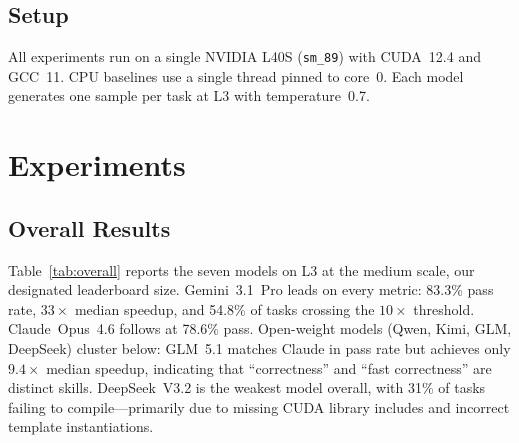 \documentclass{article}
\begin{document}
\subsection{Setup}
All experiments run on a single NVIDIA L40S (\texttt{sm\_89}) with CUDA~12.4 and GCC~11. CPU baselines use a single thread pinned to core~0. Each model generates one sample per task at L3 with temperature~0.7.

\section{Experiments}
\label{sec:results}

\subsection{Overall Results}

Table~\ref{tab:overall} reports the seven models on L3 at the medium scale, our designated leaderboard size. Gemini~3.1~Pro leads on every metric: 83.3\% pass rate, $33\times$ median speedup, and 54.8\% of tasks crossing the $10\times$ threshold. Claude~Opus~4.6 follows at 78.6\% pass. Open-weight models (Qwen, Kimi, GLM, DeepSeek) cluster below: GLM~5.1 matches Claude in pass rate but achieves only $9.4\times$ median speedup, indicating that ``correctness'' and ``fast correctness'' are distinct skills. DeepSeek~V3.2 is the weakest model overall, with 31\% of tasks failing to compile---primarily due to missing CUDA library includes and incorrect template instantiations.
\end{document}
